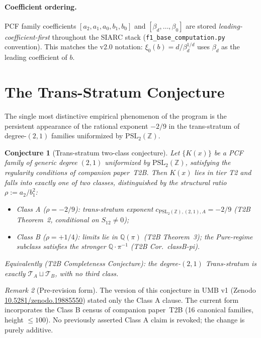 \documentclass[11pt,a4paper]{article}
\newtheorem{conjecture}{Conjecture}
\theoremstyle{definition}
\theoremstyle{remark}
\newtheorem{remark}[conjecture]{Remark}
\newcommand{\PSLZ}{\mathrm{PSL}_2(\mathbb{Z})}
\begin{document}
\paragraph{Coefficient ordering.} PCF family coefficients
$[a_2, a_1, a_0, b_1, b_0]$ and $[\beta_d, \dots, \beta_0]$ are stored
\emph{leading-coefficient-first} throughout the SIARC stack
(\texttt{f1\_base\_computation.py} convention). This matches the v2.0
notation: $\xi_0(b) = d/\beta_d^{1/d}$ uses $\beta_d$ as the leading
coefficient of $b$.

\section{The Trans-Stratum Conjecture}
\label{sec:t2b}

The single most distinctive empirical phenomenon of the program is
the persistent appearance of the rational exponent $-2/9$ in the
trans-stratum of degree-$(2,1)$ families uniformized by $\PSLZ$.

\begin{conjecture}[Trans-stratum two-class conjecture]
\label{conj:t2b}
Let $\{K(x)\}$ be a PCF family of generic degree $(2,1)$
uniformized by $\PSLZ$, satisfying the regularity conditions
of companion paper~T2B.  Then $K(x)$ lies in tier T2 and falls
into exactly one of two classes, distinguished by the
structural ratio $\rho := a_2/b_1^2$:
\begin{itemize}
  \item Class A ($\rho = -2/9$): trans-stratum exponent
        $c_{\PSLZ,(2,1),A} = -2/9$ (T2B Theorem~2,
        conditional on $S_{12}\neq 0$);
  \item Class B ($\rho = +1/4$): limits lie in
        $\mathbb{Q}(\pi)$ (T2B Theorem~3); the Pure-regime
        subclass satisfies the stronger $\mathbb{Q}\cdot\pi^{-1}$
        (T2B Cor.~classB-pi).
\end{itemize}
Equivalently (T2B Completeness Conjecture): the degree-$(2,1)$
Trans-stratum is exactly $\mathcal{T}_A \sqcup \mathcal{T}_B$,
with no third class.
\end{conjecture}

\begin{remark}[Pre-revision form]
\label{rem:t2b-prerev}
The version of this conjecture in UMB v1 (Zenodo
\href{https://doi.org/10.5281/zenodo.19885550}{10.5281/zenodo.19885550})
stated only the Class A clause.  The current form incorporates the
Class B census of companion paper~T2B (16 canonical families,
height $\leq 100$).  No previously asserted Class A claim is revoked;
the change is purely additive.
\end{remark}
\end{document}
